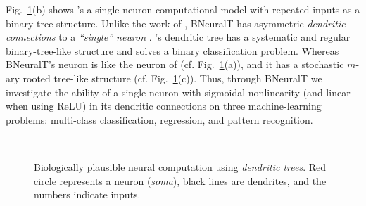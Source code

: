 \documentclass[11pt,a4paper]{article}
\begin{document}
    Fig.~\ref{fig:bio_trees}(b) shows \cite{jones2021might}'s a single neuron computational model with repeated inputs as a binary tree structure.  Unlike the work of \cite{poirazi2003pyramidal}, BNeuralT has asymmetric \textit{dendritic connections} to a \textit{``single'' neuron} \citep{beniaguev2020single,jones2021might}. \cite{jones2021might}'s dendritic tree has a systematic and regular binary-tree-like structure and solves a binary classification problem. Whereas BNeuralT's neuron is like the neuron of \cite{travis2005regional} (cf. Fig.~\ref{fig:bio_trees}(a)), and it has a stochastic $m$-ary rooted tree-like structure (cf. Fig.~\ref{fig:bio_trees}(c)). Thus, through BNeuralT we investigate the ability of a single neuron with sigmoidal nonlinearity (and linear when using ReLU) in its dendritic connections on three machine-learning problems: multi-class classification, regression, and pattern recognition. \begin{figure}
        \centering
        \qquad~\quad
        \qquad~\quad
\caption{Biologically plausible neural computation using \textit{dendritic trees}. Red circle represents a neuron (\textit{soma}), black lines are dendrites, and the numbers indicate inputs.
            \label{fig:bio_trees}}
    \end{figure}
    
\end{document}
